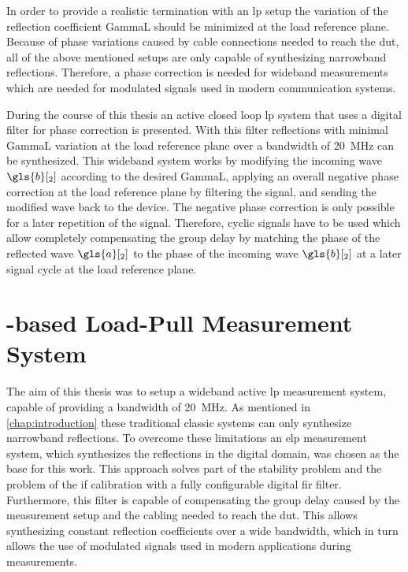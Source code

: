 \documentclass[12pt,a4paper,parskip=full,abstract=true,BCOR=12mm]{scrreprt}
\begin{document}
In order to provide a realistic termination with an \gls{lp} setup the
variation of the reflection coefficient \gls{GammaL} should be minimized at
the load reference plane. Because of phase variations caused by cable connections
needed to reach the \gls{dut}, all of the above mentioned setups are only capable
of synthesizing narrowband reflections. Therefore, a phase correction is
needed for wideband measurements which are needed for modulated signals used
in modern communication systems.

During the course of this thesis an active closed loop \gls{lp} system that uses a digital
filter for phase correction is presented. With this filter reflections with minimal
\gls{GammaL} variation at the load reference plane over a bandwidth of
\SI{20}{\mega\hertz} can be synthesized. This wideband system works by modifying
the incoming wave $\gls{b}[_2]$ according to the desired \gls{GammaL}, applying
an overall negative phase correction at the load reference plane by filtering the signal,
and sending the modified wave back to the device. The negative phase correction is
only possible for a later repetition of the signal. Therefore, cyclic signals have to
be used which allow completely compensating the group delay by matching the
phase of the reflected wave $\gls{a}[_2]$ to the phase of the incoming wave
$\gls{b}[_2]$ at a later signal cycle at the load reference plane.


\chapter{-based Load-Pull Measurement System}
\label{chap:measurement_system}

The aim of this thesis was to setup a wideband active \gls{lp} measurement system, capable of providing a bandwidth of \SI{20}{\mega\hertz}.
As mentioned in \cref{chap:introduction} these traditional classic systems can only synthesize
narrowband reflections. To overcome these limitations an \gls{elp} measurement system, which
synthesizes the reflections in the digital domain, was chosen as the base for this work. This approach solves part of the stability problem
and the problem of the \gls{if} calibration with a fully configurable digital \gls{fir} filter. Furthermore,
this filter is capable of compensating the group delay caused by the measurement setup and
the cabling needed to reach the \gls{dut}. This allows synthesizing constant reflection
coefficients over a wide bandwidth, which in turn allows the use of modulated signals
used in modern applications during measurements.
\end{document}
